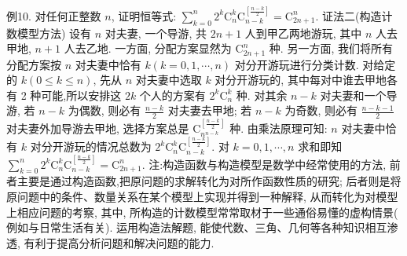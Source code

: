 例10. 对任何正整数 $n$, 证明恒等式: $\sum_{k=0}^n 2^k \mathrm{C}_n^k \mathrm{C}_{n-k}^{\left[\frac{n-k}{2}\right]}=\mathrm{C}_{2 n+1}^n$. 
证法二(构造计数模型方法)
设有 $n$ 对夫妻, 一个导游, 共 $2 n+1$ 人到甲乙两地游玩, 其中 $n$ 人去甲地, $n+1$ 人去乙地.
一方面, 分配方案显然为 $\mathrm{C}_{2 n+1}^n$ 种.
另一方面, 我们将所有分配方案按 $n$ 对夫妻中恰有 $k(k=0,1, \cdots, n)$ 对分开游玩进行分类计数.
对给定的 $k(0 \leqslant k \leqslant n)$, 先从 $n$ 对夫妻中选取 $k$ 对分开游玩的, 其中每对中谁去甲地各有 2 种可能,所以安排这 $2 k$ 个人的方案有 $2^k \mathrm{C}_n^k$ 种.
对其余 $n-k$ 对夫妻和一个导游, 若 $n-k$ 为偶数, 则必有 $\frac{n-k}{2}$ 对夫妻去甲地; 若 $n-k$ 为奇数, 则必有 $\frac{n-k-1}{2}$ 对夫妻外加导游去甲地, 选择方案总是 $\mathrm{C}_{n^{n-k}}^{\left[\frac{n-k}{2}\right]}$ 种.
由乘法原理可知: $n$ 对夫妻中恰有 $k$ 对分开游玩的情况总数为 $2^k \mathrm{C}_n^k \mathrm{C}_{n-k}^{\left[\frac{n-k}{2}\right]}$. 对 $k=0,1, \cdots, n$ 求和即知 $\sum_{k=0}^n 2^k \mathrm{C}_n^k \mathrm{C}_{n-k}^{\left[\frac{n-k}{2}\right]}=\mathrm{C}_{2 n+1}^n$.
注:构造函数与构造模型是数学中经常使用的方法, 前者主要是通过构造函数,把原问题的求解转化为对所作函数性质的研究; 后者则是将原问题中的条件、数量关系在某个模型上实现并得到一种解释, 从而转化为对模型上相应问题的考察, 其中, 所构造的计数模型常常取材于一些通俗易懂的虚构情景( 例如与日常生活有关).
运用构造法解题, 能使代数、三角、几何等各种知识相互渗透, 有利于提高分析问题和解决问题的能力.


